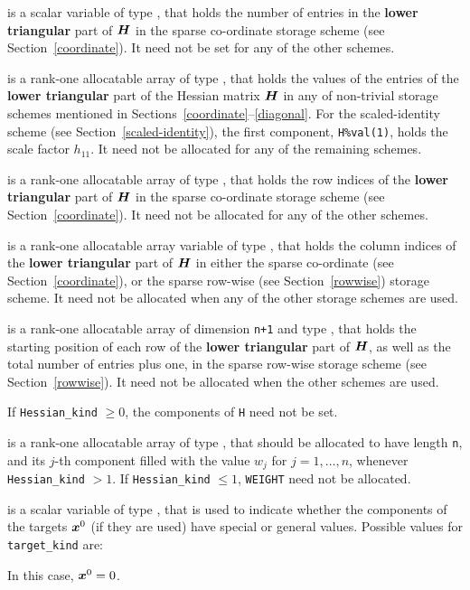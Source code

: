 \documentclass{galahad}
\begin{document}
\begin{description}
\begin{description}
 is a scalar variable of type \integer, that
holds the number of entries in the {\bf lower triangular} part of ${\bm{H}}$
in the sparse co-ordinate storage scheme (see Section~\ref{coordinate}).
It need not be set for any of the other schemes.

 is a rank-one allocatable array of type \realdp, that holds
the values of the entries of the {\bf lower triangular} part
of the Hessian matrix ${\bm{H}}$ in any of non-trivial storage schemes
mentioned in Sections~\ref{coordinate}--\ref{diagonal}.
For the scaled-identity scheme (see Section~\ref{scaled-identity}),
the first component, {\tt H\%val(1)}, holds the scale factor $h_{11}$.
It need not be allocated for any of the remaining schemes.

 is a rank-one allocatable array of type \integer,
that holds the row indices of the {\bf lower triangular} part of ${\bm{H}}$
in the sparse co-ordinate storage scheme (see Section~\ref{coordinate}).
It need not be allocated for any of the other schemes.

 is a rank-one allocatable array variable of type \integer,
that holds the column indices of the {\bf lower triangular} part of
${\bm{H}}$ in either the sparse co-ordinate
(see Section~\ref{coordinate}), or the sparse row-wise
(see Section~\ref{rowwise}) storage scheme.
It need not be allocated when any of the other storage schemes are used.

 is a rank-one allocatable array of dimension {\tt n+1} and type
\integer, that holds the starting position of
each row of the {\bf lower triangular} part of ${\bm{H}}$, as well
as the total number of entries plus one, in the sparse row-wise storage
scheme (see Section~\ref{rowwise}). It need not be allocated when the
other schemes are used.
\end{description}
If {\tt Hessian\_kind} $\geq 0$, the components of {\tt H} need not be set.

 is a rank-one allocatable array of type \realdp, that
should be allocated to have length {\tt n}, and its $j$-th component
filled with the value $w_{j}$ for $j = 1, \ldots , n$,
whenever {\tt Hessian\_kind} $>1$.
If {\tt Hessian\_kind} $\leq 1$, {\tt WEIGHT} need not be allocated.

 is a scalar variable of type \integer,
that is used to indicate whether the components of the targets ${\bm{x}}^0$
(if they are used) have special or general values. Possible values for
{\tt target\_kind} are:
\begin{description}
  In this case, ${\bm{x}}^0 = 0$.


\end{description}
\end{description}
\end{document}
